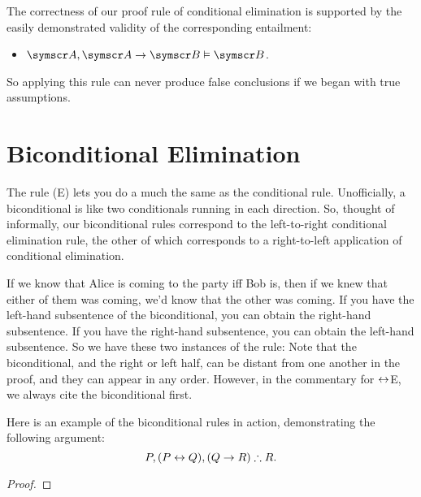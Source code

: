 The correctness of our proof rule of conditional elimination is supported by the easily demonstrated validity of the corresponding entailment: \begin{itemize}
	\item  $\meta{A}, \meta{A}\eif\meta{B}\entails \meta{B}$.
\end{itemize} So applying this rule can never produce false conclusions if we began with true assumptions.

\section{Biconditional Elimination}\label{bielim}

The  rule ({\eiff}E) lets you do a much the same as the conditional rule. Unofficially, a biconditional is like two conditionals running in each direction. So, thought of informally, our biconditional rules correspond to the left-to-right conditional elimination rule, the other of which corresponds to a right-to-left application of conditional elimination. 

If we know that Alice is coming to the party iff Bob is, then if we knew that either of them was coming, we'd know that the other was coming. If you have the left-hand subsentence of the biconditional, you can obtain the right-hand subsentence. If you have the right-hand subsentence, you can obtain the left-hand subsentence. So we have these two instances of the rule:
Note that the biconditional, and the right or left half, can be distant from one another in the proof, and they can appear in any order. However, in the commentary for $\leftrightarrow$E, we always cite the biconditional first. 

Here is an example of the biconditional rules in action, demonstrating the following argument: $$P, (P\leftrightarrow Q), (Q \rightarrow R) \mathrel{\therefore} R.$$ \begin{proof}
	\open {}
	\open {}
\end{proof}

